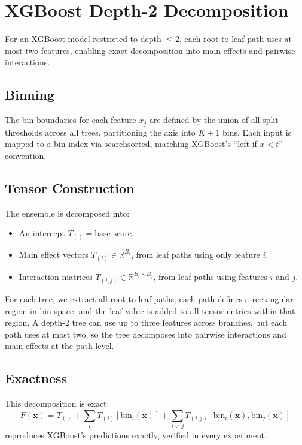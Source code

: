\section{XGBoost Depth-2 Decomposition}\label{sec:xgb-decompose}

For an XGBoost model restricted to depth $\leq 2$, each root-to-leaf path uses at most two features, enabling exact decomposition into main effects and pairwise interactions.

\subsection{Binning}

The bin boundaries for each feature $x_j$ are defined by the union of all split thresholds across all trees, partitioning the axis into $K+1$ bins.
Each input is mapped to a bin index via $\text{searchsorted}$, matching XGBoost's ``left if $x < t$'' convention.

\subsection{Tensor Construction}

The ensemble is decomposed into:
\begin{itemize}
    \item An intercept $T_{()} = \text{base\_score}$.
    \item Main effect vectors $T_{(i)} \in \mathbb{R}^{B_i}$, from leaf paths using only feature $i$.
    \item Interaction matrices $T_{(i,j)} \in \mathbb{R}^{B_i \times B_j}$, from leaf paths using features $i$ and $j$.
\end{itemize}

For each tree, we extract all root-to-leaf paths; each path defines a rectangular region in bin space, and the leaf value is added to all tensor entries within that region.
A depth-2 tree can use up to three features across branches, but each path uses at most two, so the tree decomposes into pairwise interactions and main effects at the path level.

\subsection{Exactness}

This decomposition is exact:
\[
    F(\mathbf{x}) = T_{()} + \sum_i T_{(i)}[\text{bin}_i(\mathbf{x})] + \sum_{i<j} T_{(i,j)}[\text{bin}_i(\mathbf{x}), \text{bin}_j(\mathbf{x})]
\]
reproduces XGBoost's predictions exactly, verified in every experiment.

